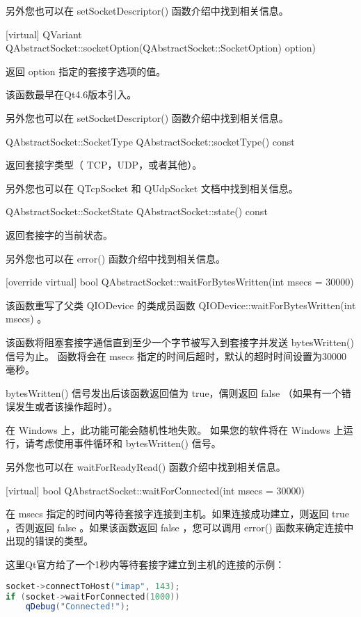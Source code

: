 另外您也可以在 setSocketDescriptor() 函数介绍中找到相关信息。

[virtual] QVariant
QAbstractSocket::socketOption(QAbstractSocket::SocketOption) option)

返回 option 指定的套接字选项的值。

该函数最早在Qt4.6版本引入。

另外您也可以在 setSocketDescriptor() 函数介绍中找到相关信息。

QAbstractSocket::SocketType QAbstractSocket::socketType() const

返回套接字类型（ TCP，UDP，或者其他）。

另外您也可以在 QTcpSocket 和 QUdpSocket 文档中找到相关信息。

QAbstractSocket::SocketState QAbstractSocket::state() const

返回套接字的当前状态。

另外您也可以在 error() 函数介绍中找到相关信息。

[override virtual] bool QAbstractSocket::waitForBytesWritten(int msecs
= 30000)

该函数重写了父类 QIODevice 的类成员函数 QIODevice::waitForBytesWritten(int msecs) 。

该函数将阻塞套接字通信直到至少一个字节被写入到套接字并发送 bytesWritten() 信号为止。 函数将会在 msecs 指定的时间后超时，默认的超时时间设置为30000毫秒。

bytesWritten() 信号发出后该函数返回值为 true，偶则返回 false （如果有一个错误发生或者该操作超时）。

\begin{notice}
在 Windows 上，此功能可能会随机性地失败。 如果您的软件将在 Windows 上运行，请考虑使用事件循环和 bytesWritten() 信号。
\end{notice}

另外您也可以在 waitForReadyRead() 函数介绍中找到相关信息。

[virtual] bool QAbstractSocket::waitForConnected(int msecs = 30000)

在 msecs 指定的时间内等待套接字连接到主机。如果连接成功建立，则返回 true ，否则返回 false 。如果该函数返回 false ，您可以调用 error() 函数来确定连接中出现的错误的类型。

这里Qt官方给了一个1秒内等待套接字建立到主机的连接的示例：


\begin{lstlisting}[language=C++]
socket->connectToHost("imap", 143);
if (socket->waitForConnected(1000))
	qDebug("Connected!");
\end{lstlisting}

